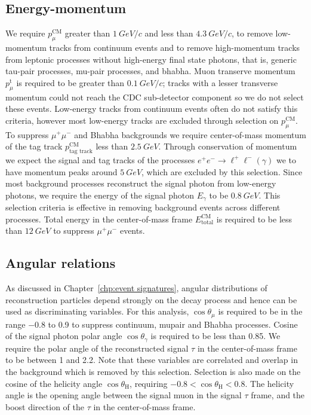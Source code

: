 \documentclass[12pt]{thesis}  %
\begin{document}
\subsection{Energy-momentum}

We require $p^{\text{CM}}_{\mu}$ greater than $\SI{1}{GeV/c}$ and less than $\SI{4.3}{GeV/c}$, to remove low-momentum tracks from continuum events and to remove high-momentum tracks from leptonic processes without high-energy final state photons, that is, generic tau-pair processes, mu-pair processes, and bhabha. Muon transerve momentum $p^{\text{t}}_{\mu}$ is required to be greater than $\SI{0.1}{GeV/c}$; tracks with a lesser transverse momentum could not reach the CDC sub-detector component so we do not select these events. Low-energy tracks from continuum events often do not satisfy this criteria, however most low-energy tracks are excluded through selection on $p^{\text{CM}}_{\mu}$. To suppress $\mu^+\mu^-$ and Bhabha backgrounds we require center-of-mass momentum of the tag track $p^{\text{CM}}_{\text{tag track}}$ less than $\SI{2.5}{GeV}$. Through conservation of momentum we expect the signal and tag tracks of the processes $e^+ e^-\to\ell^+ \ell^- (\gamma)$ we to have momentum peaks around $\SI{5}{GeV}$, which are excluded by this selection. Since most background processes reconstruct the signal photon from low-energy photons, we require the energy of the signal photon $E_{\gamma}$ to be $\SI{0.8}{GeV}$. This selection criteria is effective in removing background events across different processes. Total energy in the center-of-mass frame $E^{\text{CM}}_{\text{total}}$ is required to be less than $\SI{12}{GeV}$ to suppress $\mu^+\mu^-$ events.

\subsection{Angular relations}

As discussed in Chapter~\ref{chp:event signatures}, angular distributions of reconstruction particles depend strongly on the decay process and hence can be used as discriminating variables. For this analysis, $\cos\theta_{\mu}$ is required to be in the range \num{-0.8} to \num{0.9} to suppress continuum, mupair and Bhabha processes. Cosine of the signal photon polar angle $\cos\theta_{\gamma}$ is required to be less than \num{0.85}. We require the polar angle of the reconstructed signal $\tau$ in the center-of-mass frame to be between \num{1} and \num{2.2}. Note that these variables are correlated and overlap in the background which is removed by this selection. Selection is also made on the cosine of the helicity angle $\cos\theta_{\text{H}}$, requiring  $-0.8 < \cos\theta_{\text{H}} < 0.8$. The helicity angle is the opening angle between the signal muon in the signal $\tau$ frame, and the boost direction of the $\tau$ in the center-of-mass frame.
\end{document}
